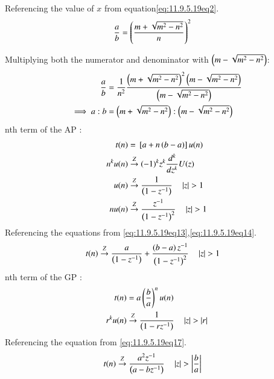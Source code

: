 \documentclass[journal,12pt,onecolumn]{IEEEtran}
\newcommand{\system}[1]{\stackrel{#1}{\rightarrow}}
\theoremstyle{remark}
\begin{document}
Referencing the value of $x$ from equation\eqref{eq:11.9.5.19eq2}.
\begin{align}
\frac{a}{b} &=\left(\frac{m + \sqrt{m^2 - n^2}}{n}\right)^2  \label{eq:11.9.5.19eq8}
\end{align}

Multiplying both the numerator and denominator with $\left(m-\sqrt{m^2 - n^2}\right)$: 
\begin{align} 
\frac{a}{b} &= \frac{1}{n^2} \frac{\left(m + \sqrt{m^2 - n^2}\right)^2  \left(m-\sqrt{m^2 - n^2}\right)}{\left(m-\sqrt{m^2 - n^2}\right)}\label{eq:11.9.5.19eq9}\\
\implies a:b &= \left( m + \sqrt{m^2 - n^2}\right): \left(m - \sqrt{m^2 - n^2}\right)\label{eq:11.9.5.19eq10}
\end{align}
nth term of the AP :
\begin{align}
t(n)&=\sbrak{a+n\brak{b-a}}u(n)\label{eq:11.9.5.19eq11}\\
n^k u(n) &\system{Z} (-1)^k z^k \frac{d^k}{dz^k}U(z)\label{eq:11.9.5.19eq12}\\
u(n) &\system{Z} \frac{1}{\brak{1 - z^{-1}}} \quad \abs{ z} > 1 \label{eq:11.9.5.19eq13}\\
nu(n) &\system{Z} \frac{z^{-1}}{\brak{1 - z^{-1}}^2} \quad \abs{ z} > 1 \label{eq:11.9.5.19eq14}
\end{align}
Referencing the equations from \eqref{eq:11.9.5.19eq13},\eqref{eq:11.9.5.19eq14}.\\
\begin{align}
t(n) &\system{Z} \frac{a}{\brak{1 - z^{-1}}}+\frac{\brak{b-a}z^{-1}}{\brak{1-z^{-1}}^2} \quad \abs{ z} > 1  \label{eq:11.9.5.19eq15}
\end{align}
nth term of the GP :
\begin{align}
t(n)&=a\brak{{\frac{b}{a}}}^n u(n)\label{eq:11.9.5.19eq16}\\
r^k u(n) &\system{Z} \frac{1}{\brak{1-rz^{-1}}} \quad \abs{ z} > \abs{r} \label{eq:11.9.5.19eq17}
\end{align}
Referencing the equation from \eqref{eq:11.9.5.19eq17}.\\
\begin{align}
t(n) &\system{Z} \frac{a^2 z^{-1}}{\brak{a-bz^{-1}}} \quad \abs{ z} > \abs{\frac{b}{a}}\label{eq:11.9.5.19eq18}
\end{align}
\end{document}
